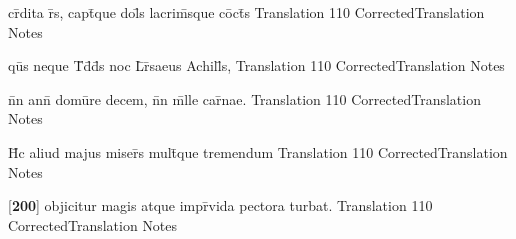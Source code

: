 \latline
  {cr\={}dita r\={}s, capt\={\macron {\i}}que dol\={\macron {\i}}s lacrim\={\macron {\i}}sque co\={}ct\={\macron {\i}}s}
  { Translation }
  {110}
  { CorrectedTranslation }
  { Notes }


\latline
  {qu\={}s neque T\={}d\={\macron {\i}}d\={}s noc L\={}r\={\macron {\i}}saeus Achill\={}s,}
  { Translation }
  {110}
  { CorrectedTranslation }
  { Notes }


\latline
  {n\={}n ann\={\macron {\i}} domu\={}re decem, n\={}n m\={\macron {\i}}lle car\={\macron {\i}}nae.}
  { Translation }
  {110}
  { CorrectedTranslation }
  { Notes }


\latline
  {H\={\macron {\i}}c aliud majus miser\={\macron {\i}}s mult\={}que tremendum}
  { Translation }
  {110}
  { CorrectedTranslation }
  { Notes }


\latline
  {[\textbf{200}] objicitur magis atque impr\={}vida pectora turbat.}
  { Translation }
  {110}
  { CorrectedTranslation }
  { Notes }



